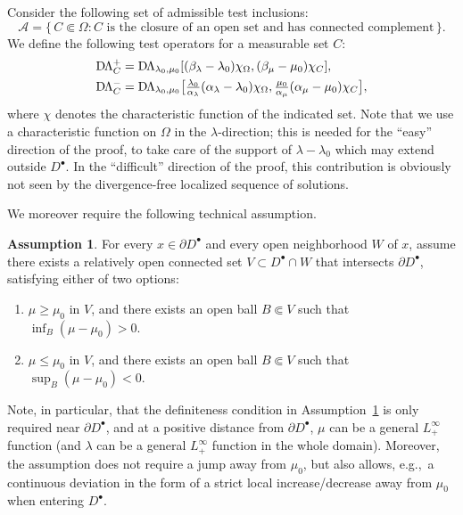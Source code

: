 \documentclass[reqno]{amsart}
\numberwithin{equation}{section}
\numberwithin{figure}{section}
\numberwithin{table}{section}
\newcommand{\DLambda}{\textup{D}\mkern-1.5mu \Lambda}
\theoremstyle{definition}
\theoremstyle{plain}
\theoremstyle{definition}
\newtheorem{assumption}[thm]{Assumption}
\theoremstyle{remark}
\numberwithin{equation}{section}
\begin{document}
Consider the following set of admissible test inclusions:
%
\begin{equation*}
	\mathcal{A} = \{\, C \Subset \Omega : C \text{ is the closure of an open set and has connected complement} \,\}.
\end{equation*}
%
We define the following test operators for a measurable set $C$:
%
\begin{align*}
	\DLambda_C^+ &= \DLambda_{\lambda_0,\mu_0} [(\beta_\lambda-\lambda_0)\chi_\Omega,(\beta_\mu-\mu_0)\chi_C], \\
	\DLambda_C^- &= \DLambda_{\lambda_0,\mu_0} \big[\tfrac{\lambda_0}{\alpha_\lambda}(\alpha_\lambda-\lambda_0)\chi_\Omega,\tfrac{\mu_0}{\alpha_\mu}(\alpha_\mu-\mu_0)\chi_C \big],
\end{align*}
%
where $\chi$ denotes the characteristic function of the indicated set. Note that we use a characteristic function on $\Omega$ in the $\lambda$-direction; this is needed for the ``easy'' direction of the proof, to take care of the support of $\lambda-\lambda_0$ which may extend outside $D^\bullet$. In the ``difficult'' direction of the proof, this contribution is obviously not seen by the divergence-free localized sequence of solutions.

We moreover require the following technical assumption. 
%
\begin{assumption} \label{assump:technical}
	For every $x\in\partial D^\bullet$ and every open neighborhood $W$ of $x$, assume there exists a relatively open connected set $V\subset D^\bullet\cap W$ that intersects $\partial D^\bullet$, satisfying either of two options:
	\begin{enumerate}[\rm(a)]
		\item $\mu\geq \mu_0$ in $V$, and there exists an open ball $B\Subset V$ such that $\inf_B(\mu -\mu_0)>0$.
		\item $\mu\leq \mu_0$ in $V$, and there exists an open ball $B\Subset V$ such that $\sup_B(\mu -\mu_0)<0$.
	\end{enumerate}
\end{assumption}
%
Note, in particular, that the definiteness condition in Assumption~\ref{assump:technical} is only required near $\partial D^\bullet$, and at a positive distance from $\partial D^\bullet$, $\mu$ can be a general $L^\infty_+$ function (and $\lambda$ can be a general $L^\infty_+$ function in the whole domain). Moreover, the assumption does not require a jump away from $\mu_0$, but also allows, e.g.,~a continuous deviation in the form of a strict local increase/decrease away from $\mu_0$ when entering $D^\bullet$.
\end{document}
